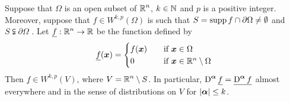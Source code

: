 \begin{lemma} \label{sob_denselem4}
Suppose that $\Omega$ is an open subset of $\displaystyle \mathbb{R}^n$,
$k\in \mathbb{N}$ and $p$ is a positive integer.  Moreover, suppose that
$\displaystyle f \in W^{k,p}(\Omega)$ 
is such that $S = \operatorname{supp} f \cap \partial \Omega \neq \emptyset$ and
$S \subsetneqq \partial \Omega$ \footnotemark.
Let $\displaystyle \underline{f}:\mathbb{R}^n \to \mathbb{R}$ be the function defined by
\[
\underline{f}({\bm{x}}) =
\begin{cases}
f({\bm{x}}) & \quad \text{if} \ {\bm{x}} \in \Omega \\
0 & \quad \text{if} \ {\bm{x}} \in \mathbb{R}^n \setminus \Omega
\end{cases}
\]
Then $\displaystyle \underline{f} \in W^{k,p}(V)$, where
$\displaystyle V = \mathbb{R}^n \setminus S$.
In particular,
$\displaystyle \operatorname{D}^{{\bm{\alpha}}} \underline{f}
= \underline{\operatorname{D}^{{\bm{\alpha}}} f}$
almost everywhere and in the sense of distributions on $V$
for $|{\bm{\alpha}}|\leq k$.
\end{lemma}


